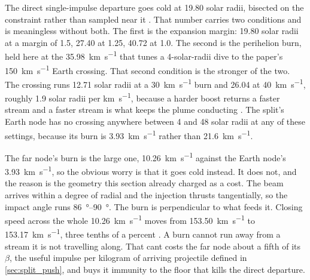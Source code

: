 \documentclass{article}
\begin{document}
The direct single-impulse departure goes cold at 19.80 solar radii, bisected on the constraint rather than sampled near it \cite{Katz_aim_is_all_you_need_2025}. That number carries two conditions and is meaningless without both. The first is the expansion margin: 19.80 solar radii at a margin of 1.5, \num{27.40} at \num{1.25}, \num{40.72} at \num{1.0}. The second is the perihelion burn, held here at the \SI{35.98}{\kilo\meter\per\second} that tunes a 4-solar-radii dive to the paper's \SI{150}{\kilo\meter\per\second} Earth crossing. That second condition is the stronger of the two. The crossing runs 12.71 solar radii at a \SI{30}{\kilo\meter\per\second} burn and 26.04 at \SI{40}{\kilo\meter\per\second}, roughly 1.9 solar radii per \si{\kilo\meter\per\second}, because a harder boost returns a faster stream and a faster stream is what keeps the plume conducting \cite{Katz_aim_is_all_you_need_2025}. The split's Earth node has no crossing anywhere between 4 and 48 solar radii at any of these settings, because its burn is \SI{3.93}{\kilo\meter\per\second} rather than \SI{21.6}{\kilo\meter\per\second}.

The far node's burn is the large one, \SI{10.26}{\kilo\meter\per\second} against the Earth node's \SI{3.93}{\kilo\meter\per\second}, so the obvious worry is that it goes cold instead. It does not, and the reason is the geometry this section already charged as a cost. The beam arrives within a degree of radial and the injection thrusts tangentially, so the impact angle runs \SIrange{86}{90}{\degree}. The burn is perpendicular to what feeds it. Closing speed across the whole \SI{10.26}{\kilo\meter\per\second} moves from \SI{153.50}{\kilo\meter\per\second} to \SI{153.17}{\kilo\meter\per\second}, three tenths of a percent \cite{Katz_aim_is_all_you_need_2025}. A burn cannot run away from a stream it is not travelling along. That cant costs the far node about a fifth of its $\beta$, the useful impulse per kilogram of arriving projectile defined in \autoref{sec:split_push}, and buys it immunity to the floor that kills the direct departure.
\end{document}

